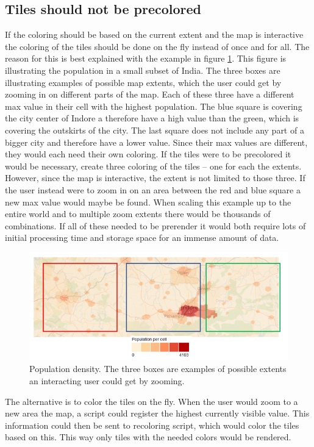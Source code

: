 \subsection{Tiles should not be precolored}
If the coloring should be based on the current extent and the map is interactive the coloring of the tiles should be done on the fly instead of once and for all. The reason for this is best explained with the example in figure \ref{WhyNotPrecolor}. This figure is illustrating the population in a small subset of India.  The three boxes are illustrating examples of possible map extents, which the user could get by zooming in on different parts of the map. Each of these three have a different max value in their cell with the highest population. The blue square is covering the city center of Indore a therefore have a high value than the green, which is covering the outskirts of the city. The last square does not include any part of a bigger city and therefore have a lower value. 
Since their max values are different, they would each need their own coloring. If the tiles were to be precolored it would be necessary, create three coloring of the tiles – one for each the extents. However, since the map is interactive, the extent is not limited to those three. If the user instead were to zoom in on an area between the red and blue square a new max value would maybe be found. When scaling this example up to the entire world and to multiple zoom extents there would be thousands of combinations. If all of these needed to be prerender it would both require lots of initial processing time and storage space for an immense amount of data. 


\begin{figure} [H]
	\centering
	\includegraphics[width=.8\textwidth]{Pictures/WhyNotPrecolor}
	\caption{Population density. The three boxes are examples of possible extents an interacting user could get by zooming.}
	\label{WhyNotPrecolor}
\end{figure}

The alternative is to color the tiles on the fly. When the user would zoom to a new area the map, a script could register the highest currently visible value. This information could then be sent to recoloring script, which would color the tiles based on this. This way only tiles with the needed colors would be rendered. 


